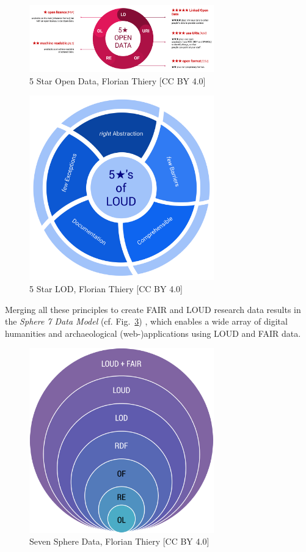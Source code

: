 \documentclass[twocolumn]{autart}
\begin{document}
\begin{figure}[!htb]
\begin{center}
\includegraphics[width=8cm]{5_Star_Open_Data.png}
\caption{5 Star Open Data, Florian Thiery [CC BY 4.0]}
\label{5sd}
\end{center}
\end{figure}

\begin{figure}[!htb]
\begin{center}
\includegraphics[width=8cm]{5_Star_LOUD.png}
\caption{5 Star LOD, Florian Thiery [CC BY 4.0]}
\label{loud}
\end{center}
\end{figure}

Merging all these principles to create FAIR and LOUD research data results in the \textit{Sphere 7 Data Model} (cf. Fig.~\ref{ssd}) \cite{thiery_sphere_2019}, which enables a wide array of digital humanities and archaeological (web-)applications using LOUD and FAIR data.

\begin{figure}[!htb]
\begin{center}
\includegraphics[width=8cm]{Loud_fair_sphere.png}
\caption{Seven Sphere Data, Florian Thiery [CC BY 4.0]}
\label{ssd}
\end{center}
\end{figure}
\end{document}
